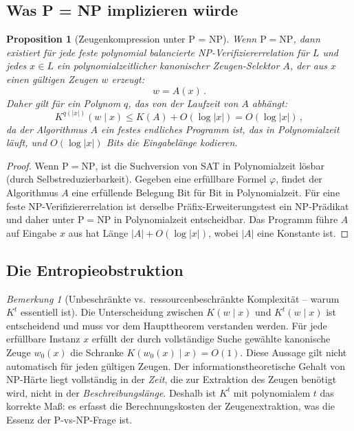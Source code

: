 \documentclass[aps,prd,twocolumn,superscriptaddress,nofootinbib]{revtex4-2}
\newtheorem{proposition}[theorem]{Proposition}
\theoremstyle{definition}
\theoremstyle{remark}
\newtheorem{remark}[theorem]{Bemerkung}
\newcommand{\NP}{\mathrm{NP}}
\newcommand{\PP}{\mathrm{P}}
\begin{document}
\subsection{Was P = NP implizieren würde}

\begin{proposition}[Zeugenkompression unter P = NP]
\label{prop:compression}
Wenn $\PP = \NP$, dann existiert für jede feste polynomial balancierte NP-Verifiziererrelation für $L$ und jedes $x \in L$ ein polynomialzeitlicher kanonischer Zeugen-Selektor $A$, der aus $x$ einen gültigen Zeugen $w$ erzeugt:
\begin{equation}
w = A(x)\,.
\end{equation}
Daher gilt für ein Polynom $q$, das von der Laufzeit von $A$ abhängt:
\begin{equation}
K^{q(|x|)}(w \mid x) \leq K(A) + O(\log|x|) = O(\log|x|)\,,
\label{eq:compression}
\end{equation}
da der Algorithmus $A$ ein festes endliches Programm ist, das in Polynomialzeit läuft, und $O(\log|x|)$ Bits die Eingabelänge kodieren.
\end{proposition}

\begin{proof}
Wenn $\PP = \NP$, ist die Suchversion von SAT in Polynomialzeit lösbar (durch Selbstreduzierbarkeit). Gegeben eine erfüllbare Formel $\varphi$, findet der Algorithmus $A$ eine erfüllende Belegung Bit für Bit in Polynomialzeit. Für eine feste NP-Verifiziererrelation ist derselbe Präfix-Erweiterungstest ein NP-Prädikat und daher unter $\PP=\NP$ in Polynomialzeit entscheidbar. Das Programm \glqq führe $A$ auf Eingabe $x$ aus\grqq{} hat Länge $|A| + O(\log|x|)$, wobei $|A|$ eine Konstante ist.
\end{proof}

\subsection{Die Entropieobstruktion}

\begin{remark}[Unbeschränkte vs.\ ressourcenbeschränkte Komplexität -- warum $K^t$ essentiell ist]
\label{rem:bounded-vs-unbounded}
Die Unterscheidung zwischen $K(w \mid x)$ und $K^t(w \mid x)$ ist entscheidend und muss vor dem Haupttheorem verstanden werden. Für jede erfüllbare Instanz $x$ erfüllt der durch vollständige
Suche gewählte kanonische Zeuge $w_0(x)$ die Schranke
$K(w_0(x)\mid x)=O(1)$. Diese Aussage gilt nicht automatisch
für jeden gültigen Zeugen. Der informationstheoretische Gehalt von NP-Härte liegt vollständig in der \textit{Zeit}, die zur Extraktion des Zeugen benötigt wird, nicht in der \textit{Beschreibungslänge}. Deshalb ist $K^t$ mit polynomialem $t$ das korrekte Maß: es erfasst die Berechnungskosten der Zeugenextraktion, was die Essenz der $\PP$-vs-$\NP$-Frage ist.
\end{remark}
\end{document}

